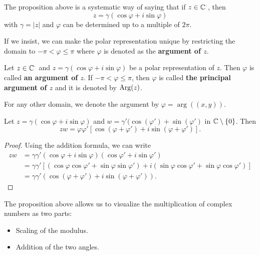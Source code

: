 \documentclass[a4paper]{report}
\begin{document}
\begin{remark}
The proposition above is a systematic way of saying that if \( z \in \mathbb{C}^{\cdot} \), then     
\[  z = \gamma (\cos \varphi + i \sin \varphi ) \]
with \( \gamma = | z  |  \) and \( \varphi  \) can be determined up to a multiple of \( 2 \pi \).
\end{remark}

If we insist, we can make the polar representation unique by restricting the domain to \( -\pi < \varphi \leq \pi \) where \( \varphi  \) is denoted as the \textbf{argument of \( z  \)}.

\begin{definition}
    Let \( z \in \mathbb{C}^{\cdot} \) and \( z = \gamma (\cos \varphi + i \sin \varphi) \) be a polar representation of \( z  \). Then \( \varphi  \) is called \textbf{an argument of \( z  \)}. If \( - \pi < \varphi \leq \pi \), then \( \varphi  \) is called \textbf{the principal argument of \( z \)} and it is denoted by \( \operatorname{Arg}(z) \). 
\end{definition}
\begin{remark}
    For any other domain, we denote the argument by \( \varphi = \arg((x,y)) \).
\end{remark}

\begin{lemma}
    Let \( z = \gamma(\cos \varphi + i \sin \varphi) \) and \( w = \gamma' (\cos(\varphi') + \sin(\varphi') \) in \( \mathbb{C} \setminus  \{ 0  \}  \). Then
    \[  zw = \varphi \varphi' [\cos(\varphi + \varphi') + i \sin(\varphi + \varphi')]. \]
\end{lemma}
\begin{proof}
Using the addition formula, we can write
\begin{align*}
    zw &= \gamma \gamma'  (\cos \varphi + i \sin \varphi)(\cos \varphi' + i \sin \varphi')  \\
       &= \gamma \gamma' [ (\cos \varphi \cos \varphi' + \sin \varphi \sin \varphi') + i(\sin \varphi \cos \varphi' + \sin \varphi \cos \varphi') ] \\
       &= \gamma \gamma' (\cos(\varphi + \varphi') + i \sin(\varphi + \varphi')).
\end{align*}
\end{proof}

The proposition above allows us to visualize the multiplication of complex numbers as two parts:
    \begin{itemize}
        \item Scaling of the modulus.
        \item Addition of the two angles.
    \end{itemize}
\end{document}
